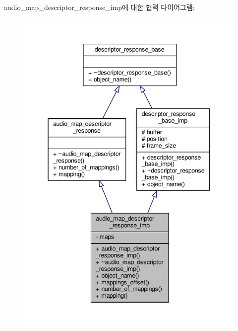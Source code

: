 audio\+\_\+map\+\_\+descriptor\+\_\+response\+\_\+imp에 대한 협력 다이어그램\+:
\nopagebreak
\begin{figure}[H]
\begin{center}
\leavevmode
\includegraphics[width=344pt]{classavdecc__lib_1_1audio__map__descriptor__response__imp__coll__graph}
\end{center}
\end{figure}
